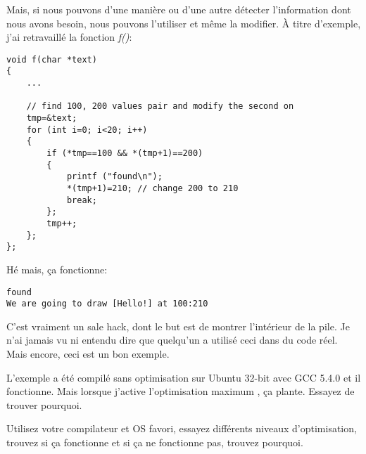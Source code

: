 Mais, si nous pouvons d'une manière ou d'une autre détecter l'information dont nous
avons besoin, nous pouvons l'utiliser et même la modifier.
À titre d'exemple, j'ai retravaillé la fonction \emph{f()}:

\begin{lstlisting}[style=customc]
void f(char *text)
{
	...

	// find 100, 200 values pair and modify the second on
	tmp=&text;
	for (int i=0; i<20; i++)
	{
		if (*tmp==100 && *(tmp+1)==200)
		{
			printf ("found\n");
			*(tmp+1)=210; // change 200 to 210
			break;
		};
		tmp++;
	};
};
\end{lstlisting}

Hé mais, ça fonctionne:

\begin{lstlisting}
found
We are going to draw [Hello!] at 100:210
\end{lstlisting}


C'est vraiment un sale hack, dont le but est de montrer l'intérieur de la pile.
Je n'ai jamais vu ni entendu dire que quelqu'un a utilisé ceci dans du code réel.
Mais encore, ceci est un bon exemple.

\myparagraph{\Exercise}

L'exemple a été compilé sans optimisation sur Ubuntu 32-bit avec GCC 5.4.0 et il
fonctionne.
Mais lorsque j'active l'optimisation maximum , ça plante.
Essayez de trouver pourquoi.

Utilisez votre compilateur et OS favori, essayez différents niveaux d'optimisation,
trouvez si ça fonctionne et si ça ne fonctionne pas, trouvez pourquoi.
